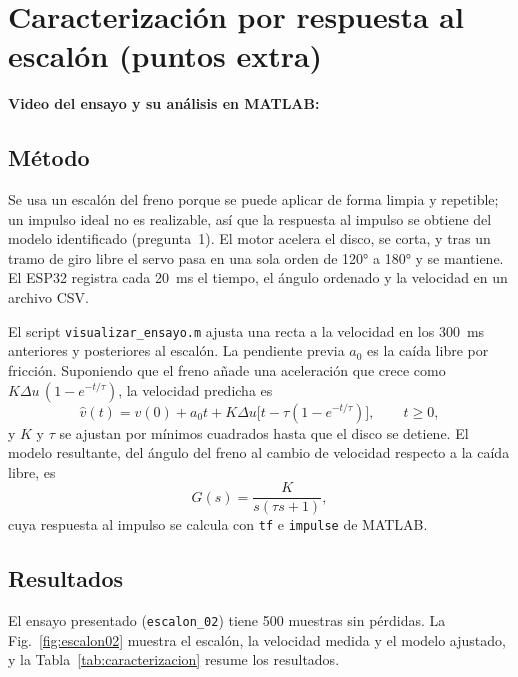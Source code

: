 \section{Caracterización por respuesta al escalón (puntos extra)}
\label{sec:p7}

\begin{center}
\textbf{Video del ensayo y su análisis en MATLAB:} \videoCaracterizacion
\end{center}

\subsection{Método}
Se usa un escalón del freno porque se puede aplicar de forma limpia y repetible; un impulso ideal
no es realizable, así que la respuesta al impulso se obtiene del modelo identificado (pregunta~1).
El motor acelera el disco, se corta, y tras un tramo de giro libre el servo pasa en una sola orden
de 120° a 180° y se mantiene. El ESP32 registra cada 20~ms el tiempo, el ángulo ordenado y la
velocidad en un archivo CSV.

El script \texttt{visualizar\_ensayo.m} ajusta una recta a la velocidad en los 300~ms anteriores y
posteriores al escalón. La pendiente previa $a_0$ es la caída libre por fricción. Suponiendo que el
freno añade una aceleración que crece como $K\Delta u\,(1-e^{-t/\tau})$, la velocidad predicha es
\[
  \widehat v(t)=v(0)+a_0t+K\Delta u\bigl[t-\tau(1-e^{-t/\tau})\bigr],\qquad t\geq 0,
\]
y $K$ y $\tau$ se ajustan por mínimos cuadrados hasta que el disco se detiene. El modelo
resultante, del ángulo del freno al cambio de velocidad respecto a la caída libre, es
\begin{equation}
  G(s)=\frac{K}{s(\tau s+1)},
  \label{eq:modelo_escalon}
\end{equation}
cuya respuesta al impulso se calcula con \texttt{tf} e \texttt{impulse} de MATLAB.

\subsection{Resultados}
El ensayo presentado (\texttt{escalon\_02}) tiene 500 muestras sin pérdidas. La
Fig.~\ref{fig:escalon02} muestra el escalón, la velocidad medida y el modelo ajustado, y la
Tabla~\ref{tab:caracterizacion} resume los resultados.

